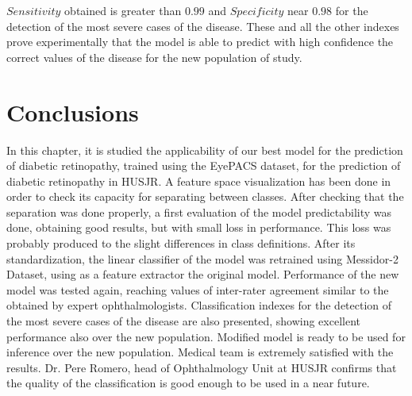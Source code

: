 $Sensitivity$ obtained is greater than $0.99$ and $Specificity$ near $0.98$ for the detection of the most severe cases of the disease. These and all the other indexes prove experimentally that the model is able to predict with high confidence the correct values of the disease for the new population of study.

\section{Conclusions}

In this chapter, it is studied the applicability of our best model for the prediction of diabetic retinopathy, trained using the EyePACS dataset, for the prediction of diabetic retinopathy in HUSJR. A feature space visualization has been done in order to check its capacity for separating between classes. After checking that the separation was done properly, a first evaluation of the model predictability was done, obtaining good results, but with small loss in performance. This loss was probably produced to the slight differences in class definitions. After its standardization, the linear classifier of the model was retrained using Messidor-2 Dataset, using as a feature extractor the original model. Performance of the new model was tested again, reaching values of inter-rater agreement similar to the obtained by expert ophthalmologists. Classification indexes for the detection of the most severe cases of the disease are also presented, showing excellent performance also over the new population. Modified model is ready to be used for inference over the new population. Medical team is extremely satisfied with the results. Dr. Pere Romero, head of Ophthalmology Unit at HUSJR confirms that the quality of the classification is good enough to be used in a near future.
